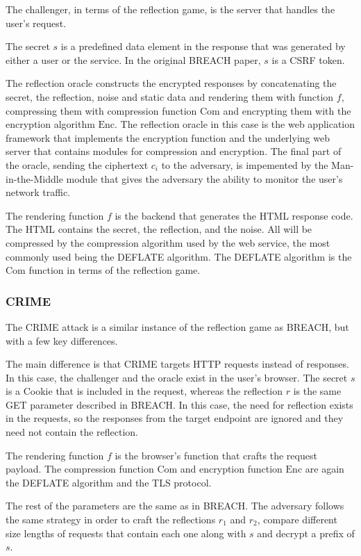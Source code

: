 \documentclass[conference, letterpaper, 10pt]{IEEEtran}
\begin{document}
The challenger, in terms of the reflection game, is the server that handles the
user's request.

The secret $s$ is a predefined data element in the response that was generated
by either a user or the service. In the original BREACH paper, $s$ is a CSRF
token.

The reflection oracle constructs the encrypted responses by concatenating the
secret, the reflection, noise and static data and rendering them with function
$f$, compressing them with compression function $\textrm{Com}$ and encrypting them with
the encryption algorithm $\textrm{Enc}$. The reflection oracle in this case is the web
application framework that implements the encryption function and the underlying
web server that contains modules for compression and encryption. The final part
of the oracle, sending the ciphertext $c_i$ to the adversary, is impemented by
the Man-in-the-Middle module that gives the adversary the ability to monitor the
user's network traffic.

The rendering function $f$ is the backend that generates the HTML response code.
The HTML contains the secret, the reflection, and the noise. All will be
compressed by the compression algorithm used by the web service, the most
commonly used being the DEFLATE algorithm. The DEFLATE algorithm is the
$\textrm{Com}$ function in terms of the reflection game.

\subsubsection{CRIME}
The CRIME attack is a similar instance of the reflection game as BREACH, but
with a few key differences.

The main difference is that CRIME targets HTTP requests instead of responses. In
this case, the challenger and the oracle exist in the user's browser. The secret
$s$ is a Cookie that is included in the request, whereas the reflection $r$ is
the same GET parameter described in BREACH. In this case, the need for
reflection exists in the requests, so the responses from the target endpoint are
ignored and they need not contain the reflection.

The rendering function $f$ is the browser's function that crafts the request
payload. The compression function $\textrm{Com}$ and encryption function
$\textrm{Enc}$ are again
the DEFLATE algorithm and the TLS protocol.

The rest of the parameters are the same as in BREACH. The adversary follows the
same strategy in order to craft the reflections $r_1$ and $r_2$, compare
different size lengths of requests that contain each one along with $s$ and
decrypt a prefix of $s$.
\end{document}
